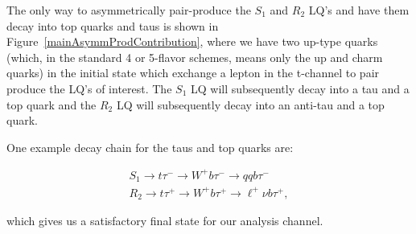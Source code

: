         
        
        The only way to asymmetrically pair-produce the $S_1$ and $R_2$ LQ's and have them decay into top quarks and taus is shown in Figure~\ref{mainAsymmProdContribution}, where we have two up-type quarks (which, in the standard 4 or 5-flavor schemes, means only the up and charm quarks) in the initial state which exchange a lepton in the t-channel to pair produce the LQ's of interest. The $S_1$ LQ will subsequently decay into a tau and a top quark and the $R_2$ LQ will subsequently decay into an anti-tau and a top quark.

        One example decay chain for the taus and top quarks are:

        \begin{gather}
            S_1 \rightarrow t\tau^- \rightarrow W^+ b \tau^- \rightarrow qqb\tau^- \\
            R_2 \rightarrow t\tau^+ \rightarrow W^+ b \tau^+ \rightarrow \ell^+ \nu b \tau^+,
        \end{gather}

        which gives us a satisfactory final state for our analysis channel.